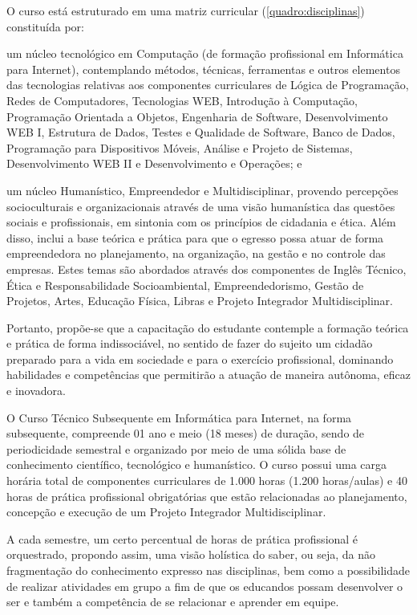 \documentclass[
	12pt,				%
	openright,			%
	twoside,			%
	a4paper,			%
	chapter=TITLE,		%
	english,			%
	french,				%
	spanish,			%
	brazil,				%
	]{abntex2}
\begin{document}
O curso está estruturado em uma matriz curricular (\autoref{quadro:disciplinas})
constituída por:
\begin{alineas}
	\item um núcleo tecnológico em Computação (de formação profissional em Informática para Internet), contemplando métodos, técnicas, ferramentas e outros elementos das tecnologias relativas aos componentes curriculares de  Lógica de Programação, Redes de Computadores, Tecnologias WEB, Introdução à Computação, Programação Orientada a Objetos, Engenharia de Software, Desenvolvimento WEB I, Estrutura de Dados, Testes e Qualidade de Software, Banco de Dados, Programação para Dispositivos Móveis, Análise e Projeto de Sistemas, Desenvolvimento WEB II e Desenvolvimento e Operações; e 
	\item um núcleo Humanístico, Empreendedor e Multidisciplinar, provendo percepções socioculturais e organizacionais através de uma visão humanística das questões sociais e profissionais, em sintonia com os princípios de cidadania e ética.  Além disso, inclui a base teórica e prática para que o egresso possa atuar de forma empreendedora no planejamento, na organização, na gestão e no controle das empresas. Estes temas são abordados através dos componentes de {Inglês Técnico,  Ética e Responsabilidade Socioambiental, Empreendedorismo, Gestão de Projetos, Artes, Educação Física, Libras} e Projeto Integrador Multidisciplinar.

\end{alineas}

Portanto, propõe-se que a capacitação do estudante contemple a formação teórica
e prática de forma indissociável, no sentido de fazer do sujeito um cidadão
preparado para a vida em sociedade e para o exercício profissional, dominando
habilidades e competências que permitirão a atuação de maneira autônoma, eficaz
e inovadora.

O Curso Técnico Subsequente em Informática para Internet, na forma subsequente, compreende 01 ano e meio (18 meses) de duração, sendo de periodicidade semestral e organizado por meio de uma sólida base de conhecimento científico, tecnológico e humanístico. O curso possui uma carga horária total de componentes curriculares de 1.000 horas (1.200 horas/aulas) e 40 horas de prática profissional obrigatórias que estão relacionadas ao planejamento, concepção e execução de um Projeto Integrador Multidisciplinar.

A cada semestre, um certo percentual de horas de prática profissional é orquestrado, propondo assim, uma visão holística do saber, ou seja, da não fragmentação do conhecimento expresso nas disciplinas, bem como a possibilidade de realizar atividades em grupo a fim de que os educandos possam desenvolver o ser e também a competência de se relacionar e aprender em equipe.
\vfill
\end{document}
